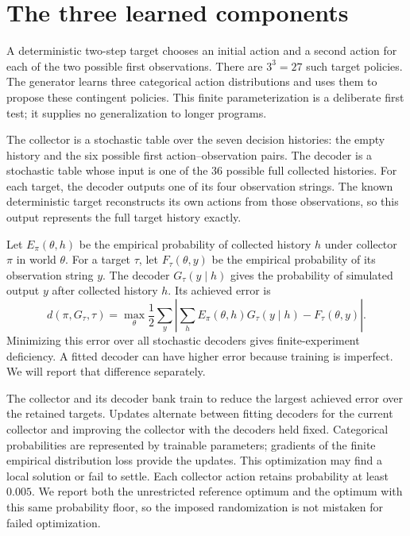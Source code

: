 \documentclass[11pt]{article}
\begin{document}
\section{The three learned components}
A deterministic two-step target chooses an initial action and a second action
for each of the two possible first observations. There are $3^3=27$ such target
policies. The generator learns three categorical action distributions and uses
them to propose these contingent policies. This finite parameterization is a
deliberate first test; it supplies no generalization to longer programs.

The collector is a stochastic table over the seven decision histories: the
empty history and the six possible first action--observation pairs. The decoder
is a stochastic table whose input is one of the 36 possible full collected
histories. For each target, the decoder outputs one of its four observation
strings. The known deterministic target reconstructs its own actions from those
observations, so this output represents the full target history exactly.

Let $E_\pi(\theta,h)$ be the empirical probability of collected history $h$
under collector $\pi$ in world $\theta$. For a target $\tau$, let
$F_\tau(\theta,y)$ be the empirical probability of its observation string $y$.
The decoder $G_\tau(y\mid h)$ gives the probability of simulated output $y$
after collected history $h$. Its achieved error is
\[
 d(\pi,G_\tau,\tau)=\max_\theta\frac12\sum_y
 \left|\sum_h E_\pi(\theta,h)G_\tau(y\mid h)-F_\tau(\theta,y)\right|.
\]
Minimizing this error over all stochastic decoders gives finite-experiment
deficiency. A fitted decoder can have higher error because training is
imperfect. We will report that difference separately.

The collector and its decoder bank train to reduce the largest achieved error
over the retained targets. Updates alternate between fitting
decoders for the current collector and improving the collector with the
decoders held fixed. Categorical probabilities are represented by trainable
parameters; gradients of the finite empirical distribution loss provide the
updates. This optimization may find a local solution or fail to settle.
Each collector action retains probability at least $0.005$. We report both the
unrestricted reference optimum and the optimum with this same probability
floor, so the imposed randomization is not mistaken for failed optimization.
\end{document}
